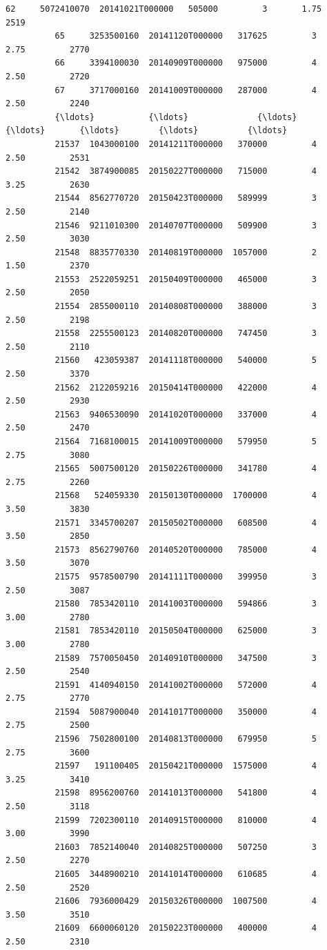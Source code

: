 \documentclass[11pt]{article}
\begin{document}
\begin{Verbatim}[commandchars=\\\{\}]
          62     5072410070  20141021T000000   505000         3       1.75         2519   
          65     3253500160  20141120T000000   317625         3       2.75         2770   
          66     3394100030  20140909T000000   975000         4       2.50         2720   
          67     3717000160  20141009T000000   287000         4       2.50         2240   
          {\ldots}           {\ldots}              {\ldots}      {\ldots}       {\ldots}        {\ldots}          {\ldots}   
          21537  1043000100  20141211T000000   370000         4       2.50         2531   
          21542  3874900085  20150227T000000   715000         4       3.25         2630   
          21544  8562770720  20150423T000000   589999         3       2.50         2140   
          21546  9211010300  20140707T000000   509900         3       2.50         3030   
          21548  8835770330  20140819T000000  1057000         2       1.50         2370   
          21553  2522059251  20150409T000000   465000         3       2.50         2050   
          21554  2855000110  20140808T000000   388000         3       2.50         2198   
          21558  2255500123  20140820T000000   747450         3       2.50         2110   
          21560   423059387  20141118T000000   540000         5       2.50         3370   
          21562  2122059216  20150414T000000   422000         4       2.50         2930   
          21563  9406530090  20141020T000000   337000         4       2.50         2470   
          21564  7168100015  20141009T000000   579950         5       2.75         3080   
          21565  5007500120  20150226T000000   341780         4       2.75         2260   
          21568   524059330  20150130T000000  1700000         4       3.50         3830   
          21571  3345700207  20150502T000000   608500         4       3.50         2850   
          21573  8562790760  20140520T000000   785000         4       3.50         3070   
          21575  9578500790  20141111T000000   399950         3       2.50         3087   
          21580  7853420110  20141003T000000   594866         3       3.00         2780   
          21581  7853420110  20150504T000000   625000         3       3.00         2780   
          21589  7570050450  20140910T000000   347500         3       2.50         2540   
          21591  4140940150  20141002T000000   572000         4       2.75         2770   
          21594  5087900040  20141017T000000   350000         4       2.75         2500   
          21596  7502800100  20140813T000000   679950         5       2.75         3600   
          21597   191100405  20150421T000000  1575000         4       3.25         3410   
          21598  8956200760  20141013T000000   541800         4       2.50         3118   
          21599  7202300110  20140915T000000   810000         4       3.00         3990   
          21603  7852140040  20140825T000000   507250         3       2.50         2270   
          21605  3448900210  20141014T000000   610685         4       2.50         2520   
          21606  7936000429  20150326T000000  1007500         4       3.50         3510   
          21609  6600060120  20150223T000000   400000         4       2.50         2310   
          

\end{Verbatim}
\end{document}
